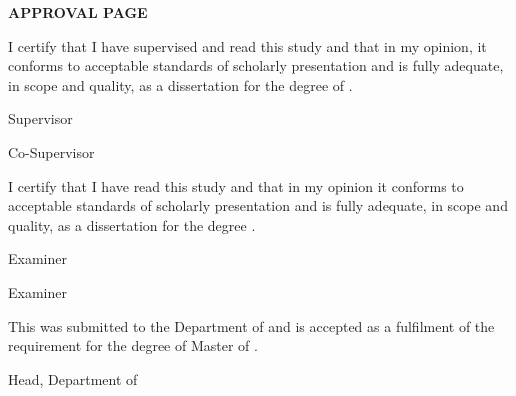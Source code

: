 \documentclass[12pt, a4paper, oneside]{memoir}
\begin{document}
\pagestyle{plain}


\begin{center}
\fontsize{14bp}{16bp}
\textbf{\MakeUppercase{Approval Page}}
\end{center}

\vspace{24pt}

\fontsize{12bp}{14bp}
\noindent I certify that I have supervised and read this study and that in my opinion, it 
conforms to acceptable standards of scholarly presentation and is fully 
adequate, in scope and quality, as a dissertation for the degree of \myDegree.
\\[18pt]

\hfill \makebox[2in]{\dotfill}

\hfill \mySupervisor

\hfill Supervisor\\[6pt]

\ifdefined\myCoSupervisor
  \hfill \makebox[2in]{\dotfill}

  \hfill \myCoSupervisor

  \hfill Co-Supervisor\\[18pt]
\fi

\ifdefined\myExaminerOne
  \noindent I certify that I have read this study and that in my opinion it 
  conforms to acceptable standards of scholarly presentation and is fully 
  adequate, in scope and quality, as a dissertation for the degree 
  \myDegree.\\[18pt]

  \hfill \makebox[2in]{\dotfill}

  \hfill \myExaminerOne

  \hfill Examiner\\[18pt]

  \ifdefined\myExaminerTwo

    \hfill \makebox[2in]{\dotfill}

    \hfill \myExaminerTwo

    \hfill Examiner\\[6pt]
  \fi
\fi

\ifdefined\myDepartmentHead
  \noindent This \myDocument was submitted to the Department of \myDepartment and is accepted as a fulfilment of the requirement for the degree of Master of \mySubject.\\[18pt]

  \hfill \makebox[2in]{\dotfill}

  \hfill \myDepartmentHead

  \hfill Head, Department of \myDepartment\\[6pt]
\fi
\end{document}
